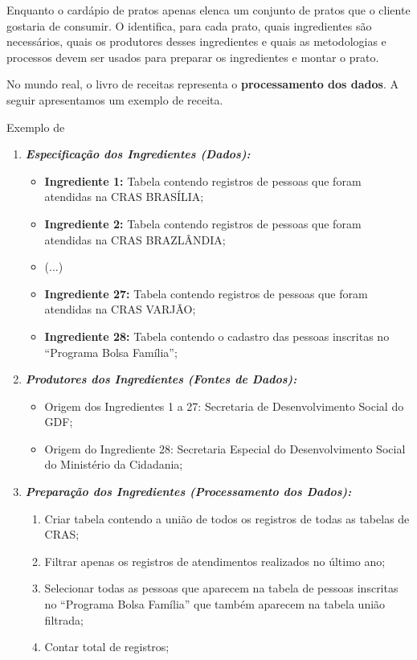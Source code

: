     Enquanto o cardápio de pratos apenas elenca um conjunto de pratos que o cliente gostaria de consumir. O \LIVRODERECEITAS \xspace identifica, para cada prato, quais ingredientes são necessários, quais os produtores desses ingredientes e quais as metodologias e processos devem ser usados para preparar os ingredientes e montar o prato.
    
    No mundo real, o livro de receitas representa o \textbf{processamento dos dados}. A seguir apresentamos um exemplo de receita.
    
    \begin{env-exemplo}{Exemplo de \RECEITA}
        \begin{enumerate}
            \item \emph{\textbf{Especificação dos Ingredientes (Dados):}}
                \begin{itemize}
                    \item \textbf{Ingrediente 1:} Tabela contendo registros de pessoas que foram atendidas na CRAS BRASÍLIA;
                    \item \textbf{Ingrediente 2:} Tabela contendo registros de pessoas que foram atendidas na CRAS BRAZLÂNDIA;
                    \item (...)                
                    \item \textbf{Ingrediente 27:} Tabela contendo registros de pessoas que foram atendidas na CRAS VARJÃO;
                    \item \textbf{Ingrediente 28:} Tabela contendo o cadastro das pessoas inscritas no ``Programa Bolsa Família'';  
                \end{itemize}
            \item \emph{\textbf{Produtores dos Ingredientes (Fontes de Dados):}}
                \begin{itemize}
                    \item Origem dos Ingredientes 1 a 27: Secretaria de Desenvolvimento Social do GDF;
                    \item Origem do Ingrediente 28: Secretaria Especial do Desenvolvimento Social do Ministério da Cidadania;
                \end{itemize}
            \item \emph{\textbf{Preparação dos Ingredientes (Processamento dos Dados):}}
                \begin{enumerate}
                    \item Criar tabela contendo a união de todos os registros de todas as tabelas de CRAS;
                    \item Filtrar apenas os registros de atendimentos realizados no último ano;
                    \item Selecionar todas as pessoas que aparecem na tabela de pessoas inscritas no ``Programa Bolsa Família'' que também aparecem na tabela união filtrada;
                    \item Contar total de registros;
                \end{enumerate}
        \end{enumerate}
    \end{env-exemplo}    

